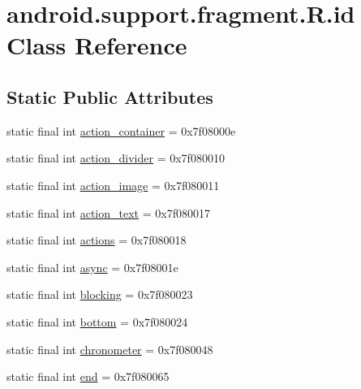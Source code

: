 \hypertarget{classandroid_1_1support_1_1fragment_1_1_r_1_1id}{}\section{android.\+support.\+fragment.\+R.\+id Class Reference}
\label{classandroid_1_1support_1_1fragment_1_1_r_1_1id}
\subsection*{Static Public Attributes}
\begin{DoxyCompactItemize}
\item 
static final int \mbox{\hyperlink{classandroid_1_1support_1_1fragment_1_1_r_1_1id_ad4bec45cf9cff52d520e860a574aa226}{action\+\_\+container}} = 0x7f08000e
\item 
static final int \mbox{\hyperlink{classandroid_1_1support_1_1fragment_1_1_r_1_1id_ad811bb6964dcc433ccc688817648d8be}{action\+\_\+divider}} = 0x7f080010
\item 
static final int \mbox{\hyperlink{classandroid_1_1support_1_1fragment_1_1_r_1_1id_a135eef42157f8f706a6c74f8fcba6134}{action\+\_\+image}} = 0x7f080011
\item 
static final int \mbox{\hyperlink{classandroid_1_1support_1_1fragment_1_1_r_1_1id_afbdd120fa0aabb9a6df0d71b036812c2}{action\+\_\+text}} = 0x7f080017
\item 
static final int \mbox{\hyperlink{classandroid_1_1support_1_1fragment_1_1_r_1_1id_ae14cedff31dc8e6312a5676db60c9646}{actions}} = 0x7f080018
\item 
static final int \mbox{\hyperlink{classandroid_1_1support_1_1fragment_1_1_r_1_1id_ae3f9c73e6d119f64fb24f8073b386d49}{async}} = 0x7f08001e
\item 
static final int \mbox{\hyperlink{classandroid_1_1support_1_1fragment_1_1_r_1_1id_ae4aa5f931fb8f34e17062e5788ea047d}{blocking}} = 0x7f080023
\item 
static final int \mbox{\hyperlink{classandroid_1_1support_1_1fragment_1_1_r_1_1id_aed8539d60469fd437e672768cecede4a}{bottom}} = 0x7f080024
\item 
static final int \mbox{\hyperlink{classandroid_1_1support_1_1fragment_1_1_r_1_1id_a4e681b3334ae6de2690be4150ee81814}{chronometer}} = 0x7f080048
\item 
static final int \mbox{\hyperlink{classandroid_1_1support_1_1fragment_1_1_r_1_1id_af329f6eba3c913f97e6dcc9e0ac0f76b}{end}} = 0x7f080065
\item 

\end{DoxyCompactItemize}
